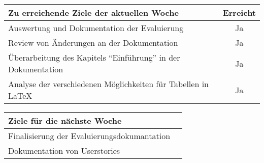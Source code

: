 \begin{tabularx}{\textwidth}{Xc}
    \arrayrulecolor{OliveGreen}
    \toprule
    {\bfseries Zu erreichende Ziele der aktuellen Woche} & {\bfseries Erreicht} \\
    \midrule[2pt]
    Auswertung und Dokumentation der Evaluierung         &Ja                    \\
    \rowcolor{OliveGreen!15}
    Review von Änderungen an der Dokumentation           &Ja                    \\
    \rowcolor{White}
    Überarbeitung des Kapitels ``Einführung'' in der Dokumentation &Ja          \\
    \rowcolor{OliveGreen!15}
    Analyse der verschiedenen Möglichkeiten für Tabellen in \LaTeX{} &Ja        \\
    \bottomrule[2pt]
\end{tabularx}
%
\vspace{1cm}
%
\begin{tabularx}{\textwidth}{Xc}
    \arrayrulecolor{OliveGreen}
    \toprule
    {\bfseries Ziele für die nächste Woche}              &                      \\
    \midrule[2pt]
    Finalisierung der Evaluierungsdokumantation          &                      \\
    \rowcolor{OliveGreen!15}
    Dokumentation von Userstories                        &                      \\
\end{tabularx}
